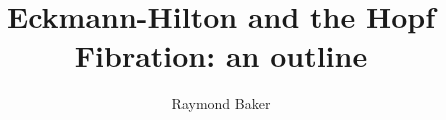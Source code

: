 



\lhead{} \chead{} \rhead{}

\title{Eckmann-Hilton and the Hopf Fibration: an outline}
\author{Raymond Baker}
\date{}




\maketitle







